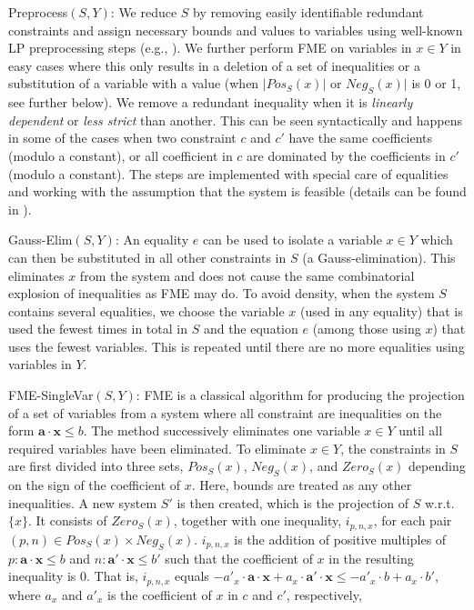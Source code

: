 \documentclass{llncs}
\newcommand{\Pos}{\mathit{Pos}}
\newcommand{\Neg}{\mathit{Neg}}
\newcommand{\mi}{\mathit}
\newcommand{\ve}{\mathbf}
\begin{document}
{{\sc Preprocess}$(S,Y)$:} We reduce $S$ by removing easily identifiable redundant constraints and assign necessary bounds and values to variables using well-known LP preprocessing steps (e.g., \cite{andersen95}). %
We further perform FME on variables in $x\in Y$ in easy cases where this only results in a deletion of a set of inequalities or a substitution of a variable with a value (when $|\Pos_S(x)|$ or $\Neg_S(x)|$ is 0 or 1, see further below). We remove a redundant inequality when it is \emph{linearly dependent} or \emph{less strict} than another. This can be seen syntactically and happens in some of the cases when two constraint $c$ and $c'$ have the same coefficients (modulo a constant), or all coefficient in $c$ are dominated by the coefficients in $c'$ (modulo a constant). 
The steps are implemented with special care of equalities and working with the assumption that the system is feasible (details can be found in \cite{mytechrep}).

{{\sc Gauss-Elim}$(S,Y)$:} An equality $e$ can be used to isolate a variable $x\in Y$ which can then be substituted in all other constraints in $S$ (a Gauss-elimination). This eliminates $x$ from the system and does not cause the same combinatorial explosion of inequalities as FME may do. %
To avoid density, when the system $S$ contains several equalities, we choose the variable $x$ (used in any equality) that is used the fewest times in total in $S$ and the equation $e$ (among those using $x$) that uses the fewest variables. 
This is repeated until there are no more equalities using variables in $Y$.

{{\sc FME-SingleVar}$(S,Y)$:} FME is a classical algorithm for producing the projection of a set of variables from a system where all constraint are inequalities on the form $\ve{a}\cdot \ve{x}\leq b$. The method successively eliminates one variable $x\in Y$ until all required variables have been eliminated. To eliminate $x\in Y$, the constraints in $S$ are first divided into three sets, $\Pos_S(x)$, $\Neg_S(x)$, and $\mi{Zero}_S(x)$ depending on the sign of the coefficient of $x$. Here, bounds are treated as any other inequalities. 
A new system $S'$ is then created, which is the projection of $S$ w.r.t. $\{x\}$. It consists of $\mi{Zero}_S(x)$, together with one inequality, $i_{p,n,x}$, for each pair $(p,n)\in \Pos_S(x)\times \Neg_S(x)$. $i_{p,n,x}$ is the addition of positive multiples of $p:\ve{a}\cdot\ve{x} \leq b$ and $n:\ve{a}'\cdot\ve{x} \leq b'$ such that the coefficient of $x$ in the resulting inequality is $0$. That is, $i_{p,n,x}$ equals $-a'_x\cdot \ve{a}\cdot\ve{x} + a_x\cdot \ve{a}'\cdot\ve{x} \leq -a'_x\cdot b + a_x\cdot b'$, where $a_x$ and $a'_x$ is the coefficient of $x$ in $c$ and $c'$, respectively,
\end{document}

